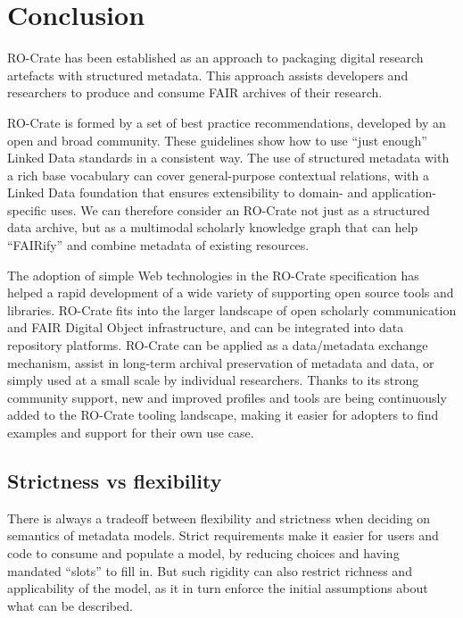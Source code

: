 \documentclass[ds,v1.1.2,openaccess]{iosart2x}%
\begin{document}
\section{Conclusion}

\label{sec:conclusion}

RO-Crate has been established as an approach to packaging digital
research artefacts with structured metadata. This approach assists
developers and researchers to produce and consume FAIR archives of
their research.

RO-Crate is formed by a set of best practice recommendations, developed
by an open and broad community. These guidelines show how to use ``just
enough'' Linked Data standards in a consistent way. The use of
structured metadata with a rich base vocabulary can cover
general-purpose contextual relations, with a Linked Data foundation
that ensures extensibility to domain- and application-specific uses. We
can therefore consider an RO-Crate not just as a structured data
archive, but as a multimodal scholarly knowledge graph that can help
``FAIRify'' and combine metadata of existing resources.

The adoption of simple Web technologies in the RO-Crate specification
has helped a rapid development of a wide variety of supporting open
source tools and libraries. RO-Crate fits into the larger landscape of
open scholarly communication and FAIR Digital Object infrastructure,
and can be integrated into data repository platforms. RO-Crate can be
applied as a data/metadata exchange mechanism, assist in long-term
archival preservation of metadata and data, or simply used at a small
scale by individual researchers. Thanks to its strong community
support, new and improved profiles and tools are being continuously
added to the RO-Crate tooling landscape, making it easier for adopters
to find examples and support for their own use case.

\subsection{Strictness vs flexibility}

There is always a tradeoff between flexibility and strictness
\cite{doi:10.1007/s11042-009-0397-2} when deciding on semantics of metadata
models. Strict requirements make it easier for users and code to
consume and populate a model, by reducing choices and having mandated
``slots'' to fill in. But such rigidity can also restrict richness and
applicability of the model, as it in turn enforce the initial
assumptions about what can be described.
\end{document}
